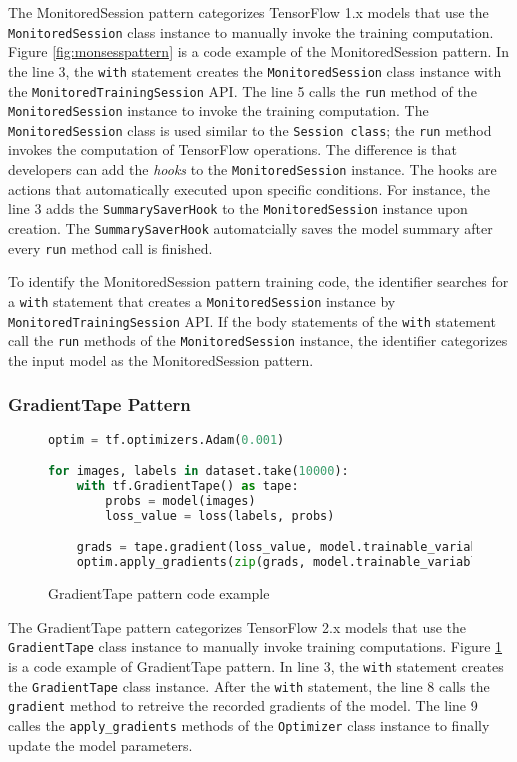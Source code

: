 The MonitoredSession pattern categorizes TensorFlow 1.x models that
use the {\tt MonitoredSession} class instance to manually invoke the 
training computation.
Figure \ref{fig:monsesspattern} is a code example of the MonitoredSession 
pattern.
In the line 3, the {\tt with} statement creates the {\tt MonitoredSession}
class instance with the {\tt MonitoredTrainingSession} API.
The line 5 calls the {\tt run} method of the {\tt MonitoredSession} instance 
to invoke the training computation.
The {\tt MonitoredSession} class is used similar to the {\tt Session class};
the {\tt run} method invokes the computation of TensorFlow operations.
The difference is that developers can add the \textit{hooks} to the
{\tt MonitoredSession} instance. The hooks are actions that automatically 
executed upon specific conditions. 
For instance, the line 3 adds the {\tt SummarySaverHook} to the
{\tt MonitoredSession} instance upon creation.
The {\tt SummarySaverHook} automatcially saves the model summary 
after every {\tt run} method call is finished.

To identify the MonitoredSession pattern training code,
the identifier searches for a {\tt with} statement that creates a
{\tt MonitoredSession} instance by {\tt MonitoredTrainingSession} API.
If the body statements of the {\tt with} statement call the {\tt run} methods 
of the {\tt MonitoredSession} instance, 
the identifier categorizes the input model as the MonitoredSession pattern. 


\subsubsection{GradientTape Pattern}

\begin{figure}[!ht]
  \begin{lstlisting}[language=Python]
optim = tf.optimizers.Adam(0.001)

for images, labels in dataset.take(10000):
    with tf.GradientTape() as tape:
        probs = model(images)
        loss_value = loss(labels, probs)

    grads = tape.gradient(loss_value, model.trainable_variables)
    optim.apply_gradients(zip(grads, model.trainable_variables))
  \end{lstlisting}
  \caption{GradientTape pattern code example}
  \label{fig:tapepattern}
\end{figure}


The GradientTape pattern categorizes TensorFlow 2.x models that
use the {\tt GradientTape} class instance to manually invoke training 
computations. Figure \ref{fig:tapepattern} is a code example of 
GradientTape pattern.
In line 3, the {\tt with} statement creates the {\tt GradientTape} class
instance. 
After the {\tt with} statement, the line 8 calls the {\tt gradient} method
to retreive the recorded gradients of the model.
The line 9 calles the {\tt apply\_gradients} methods of the {\tt Optimizer}
class instance to finally update the model parameters.


